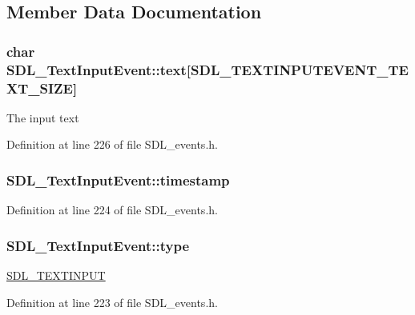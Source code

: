 \subsection{Member Data Documentation}
\hypertarget{struct_s_d_l___text_input_event_a1a95531f466dff01c2f108f53ff24554}{
\subsubsection[{text}]{\setlength{\rightskip}{0pt plus 5cm}char S\-D\-L\-\_\-\-Text\-Input\-Event\-::text\mbox{[}{\bf S\-D\-L\-\_\-\-T\-E\-X\-T\-I\-N\-P\-U\-T\-E\-V\-E\-N\-T\-\_\-\-T\-E\-X\-T\-\_\-\-S\-I\-Z\-E}\mbox{]}}}\label{struct_s_d_l___text_input_event_a1a95531f466dff01c2f108f53ff24554}
The input text 

Definition at line 226 of file S\-D\-L\-\_\-events.\-h.

\hypertarget{struct_s_d_l___text_input_event_a20b190a96494918690ea7f99187be948}{
\subsubsection[{timestamp}]{ S\-D\-L\-\_\-\-Text\-Input\-Event\-::timestamp}}\label{struct_s_d_l___text_input_event_a20b190a96494918690ea7f99187be948}


Definition at line 224 of file S\-D\-L\-\_\-events.\-h.

\hypertarget{struct_s_d_l___text_input_event_a90576be2ea52e694deff40d0586654f5}{
\subsubsection[{type}]{ S\-D\-L\-\_\-\-Text\-Input\-Event\-::type}}\label{struct_s_d_l___text_input_event_a90576be2ea52e694deff40d0586654f5}
\hyperlink{_s_d_l__events_8h_a3b589e89be6b35c02e0dd34a55f3fccaa4fa2570088f6b9cbd109ae91b511368f}{S\-D\-L\-\_\-\-T\-E\-X\-T\-I\-N\-P\-U\-T} 

Definition at line 223 of file S\-D\-L\-\_\-events.\-h.

